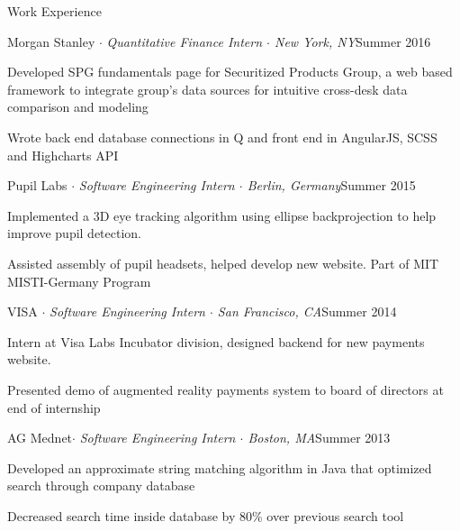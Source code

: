 \documentclass{resume} %
\begin{document}
\begin{rSection}{Work Experience}

\begin{rSubsection}{Morgan Stanley {\normalfont $\cdot$ \em Quantitative Finance Intern $\cdot$ New York, NY}}{Summer 2016}{}{}
\item Developed SPG fundamentals page for Securitized Products Group, a web based framework to integrate group's data sources for intuitive cross-desk data comparison and modeling
\item Wrote back end database connections in Q and front end in AngularJS, SCSS and Highcharts API
\end{rSubsection}


\begin{rSubsection}{Pupil Labs {\normalfont $\cdot$ \em Software Engineering Intern $\cdot$ Berlin, Germany}}{Summer 2015}{}{}
\item Implemented a 3D eye tracking algorithm using ellipse backprojection to help improve pupil detection.
\item Assisted assembly of pupil headsets, helped develop new website. Part of MIT MISTI-Germany Program
\end{rSubsection}


\begin{rSubsection}{VISA {\normalfont $\cdot$ \em Software Engineering Intern $\cdot$ San Francisco, CA}}{Summer 2014}{}{}
\item Intern at Visa Labs Incubator division, designed backend for new payments website. 
\item Presented demo of augmented reality payments system to board of directors at end of internship
\end{rSubsection}


\begin{rSubsection}{AG Mednet{\normalfont $\cdot$ \em Software Engineering Intern $\cdot$ Boston, MA}}{Summer 2013}{}{}
\item Developed an approximate string matching algorithm in Java that optimized search through company database
\item Decreased search time inside database by 80\% over previous search tool
\end{rSubsection}


\end{rSection}
\end{document}
